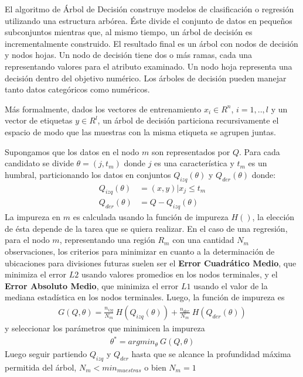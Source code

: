 El algoritmo de Árbol de Decisión construye modelos de clasificación o regresión
utilizando una estructura arbórea. Éste divide el conjunto de datos en pequeños
subconjuntos mientras que, al mismo tiempo, un árbol de decisión es incrementalmente
construido. El resultado final es un árbol con nodos de decisión y nodos hojas.
Un nodo de decisión tiene dos o más ramas, cada una representando valores para
el atributo examinado. Un nodo hoja representa una decisión dentro del
objetivo numérico. Los árboles de decisión pueden manejar tanto datos
categóricos como numéricos.

Más formalmente, dados los vectores de entrenamiento $x_{i} \in R^{n}$, $i = 1,..,l$
y un vector de etiquetas $y \in R^{l}$, un árbol de decisión particiona
recursivamente el espacio de modo que las muestras con la misma etiqueta se agrupen juntas.

Supongamos que los datos en el nodo $m$ son representados por $Q$. Para cada
candidato se divide $\theta = (j, t_{m})$ donde $j$ es una característica y
$t_{m}$ es un humbral, particionando los datos en conjuntos $Q_{izq}(\theta)$ y
$Q_{der}(\theta)$ donde:
\begin{align}
  Q_{izq}(\theta) &= (x, y) | x_{j} \leq t_m \\
  Q_{der}(\theta) &= Q - Q_{izq}(\theta)
\end{align}
La impureza en $m$ es calculada usando la función de impureza $H()$, la elección
de ésta depende de la tarea que se quiera realizar.
En el caso de una regresión, para el nodo $m$, representando una
región $R_{m}$ con una cantidad $N_{m}$ observaciones, los criterios
para minimizar en cuanto a la determinación de ubicaciones para divisiones
futuras suelen ser el \textbf{Error Cuadrático Medio}, que minimiza el error $L2$ usando
valores promedios en los nodos terminales, y el \textbf{Error Absoluto Medio}, que minimiza
el error $L1$ usando el valor de la mediana estadística en los nodos terminales.
Luego, la función de impureza es
\begin{align}
  G(Q, \theta) = \frac{n_{izq}}{N_{m}} \ H(Q_{izq}(\theta)) + \frac{n_{der}}{N_{m}} \ H(Q_{der}(\theta))
\end{align}
y seleccionar los parámetros que minimicen la impureza
\begin{align}
  \theta^{*} = argmin_{\theta} \ G(Q, \theta)
\end{align}
Luego seguir partiendo $Q_{izq}$ y $Q_{der}$ hasta que se alcance la profundidad
máxima permitida del árbol, $N_{m} < min_{muestras}$ o bien $N_{m} = 1$


